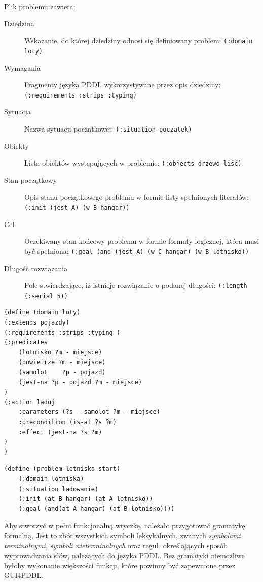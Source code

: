 Plik problemu zawiera:
\begin{description}
\item[Dziedzina] Wskazanie, do której dziedziny odnosi się definiowany problem: \texttt{(:domain loty)}
\item[Wymagania] Fragmenty języka PDDL wykorzystywane przez opis dziedziny: \texttt{(:requirements :strips :typing)}
\item[Sytuacja] Nazwa sytuacji początkowej: \texttt{(:situation początek)}
\item[Obiekty] Lista obiektów występujących w problemie: \texttt{(:objects drzewo liść)}
\item[Stan początkowy] Opis stanu początkowego problemu w formie listy spełnionych literałów: \texttt{(:init (jest A) (w B hangar))}
\item[Cel] Oczekiwany stan końcowy problemu w formie formuły logicznej, która musi być spełniona: \texttt{(:goal (and (jest A) (w C hangar) (w B lotnisko))}
\item[Długość rozwiązania] Pole stwierdzające, iż istnieje rozwiązanie o podanej długości: \texttt{(:length (:serial 5))}
\end{description}
\begin{Code}
\begin{lstlisting}[language=LISP,frame=single,label=ana_code, caption=Zawartość przykładowego pliku dziedziny]
(define (domain loty)
(:extends pojazdy)
(:requirements :strips :typing )
(:predicates
	(lotnisko ?m - miejsce)
	(powietrze ?m - miejsce)
	(samolot	?p - pojazd)
	(jest-na ?p - pojazd ?m - miejsce)
)
(:action laduj
	:parameters (?s - samolot ?m - miejsce)
   	:precondition (is-at ?s ?m) 
	:effect (jest-na ?s ?m) 
)
)
\end{lstlisting}
\end{Code}

\begin{Code}
\begin{lstlisting}[language=LISP,frame=single,label=ana_code, caption=Zawartość przykładowego pliku problemu]
(define (problem lotniska-start)
	(:domain lotniska)
	(:situation ladowanie)
	(:init (at B hangar) (at A lotnisko))
	(:goal (and(at A hangar) (at B lotnisko))))
\end{lstlisting}
\end{Code}

Aby stworzyć w pełni funkcjonalną wtyczkę, należało przygotować gramatykę formalną, Jest to zbór wszystkich symboli leksykalnych, zwanych \emph{symbolami terminalnymi, symboli nieterminalnych} oraz reguł, określających sposób wyprowadzania słów, należących do języka PDDL. Bez gramatyki niemożliwe byłoby wykonanie większości funkcji, które powinny być zapewnione przez GUI4PDDL. 

